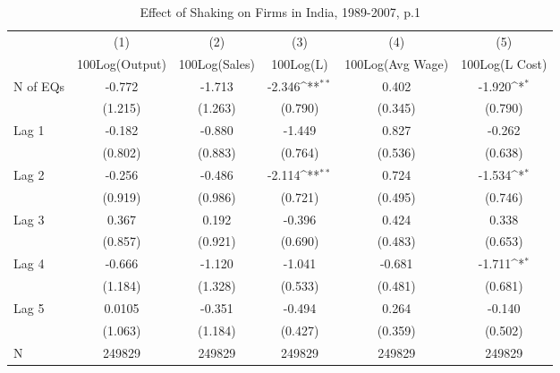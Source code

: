 \begin{table}[htbp]\centering
\def\sym#1{\ifmmode^{#1}\else\(^{#1}\)\fi}
\caption{Effect of Shaking on Firms in India, 1989-2007, p.1}
\begin{tabular}{l*{5}{c}}
\toprule
                &\multicolumn{1}{c}{(1)}&\multicolumn{1}{c}{(2)}&\multicolumn{1}{c}{(3)}&\multicolumn{1}{c}{(4)}&\multicolumn{1}{c}{(5)}\\
                &\multicolumn{1}{c}{100Log(Output)}&\multicolumn{1}{c}{100Log(Sales)}&\multicolumn{1}{c}{100Log(L)}&\multicolumn{1}{c}{100Log(Avg Wage)}&\multicolumn{1}{c}{100Log(L Cost)}\\
\midrule
N of EQs        &   -0.772         &   -1.713         &   -2.346\sym{**} &    0.402         &   -1.920\sym{*}  \\
                &  (1.215)         &  (1.263)         &  (0.790)         &  (0.345)         &  (0.790)         \\
\addlinespace
Lag 1           &   -0.182         &   -0.880         &   -1.449         &    0.827         &   -0.262         \\
                &  (0.802)         &  (0.883)         &  (0.764)         &  (0.536)         &  (0.638)         \\
\addlinespace
Lag 2           &   -0.256         &   -0.486         &   -2.114\sym{**} &    0.724         &   -1.534\sym{*}  \\
                &  (0.919)         &  (0.986)         &  (0.721)         &  (0.495)         &  (0.746)         \\
\addlinespace
Lag 3           &    0.367         &    0.192         &   -0.396         &    0.424         &    0.338         \\
                &  (0.857)         &  (0.921)         &  (0.690)         &  (0.483)         &  (0.653)         \\
\addlinespace
Lag 4           &   -0.666         &   -1.120         &   -1.041         &   -0.681         &   -1.711\sym{*}  \\
                &  (1.184)         &  (1.328)         &  (0.533)         &  (0.481)         &  (0.681)         \\
\addlinespace
Lag 5           &   0.0105         &   -0.351         &   -0.494         &    0.264         &   -0.140         \\
                &  (1.063)         &  (1.184)         &  (0.427)         &  (0.359)         &  (0.502)         \\
\midrule
N               &   249829         &   249829         &   249829         &   249829         &   249829         \\

\end{tabular}
\end{table}
